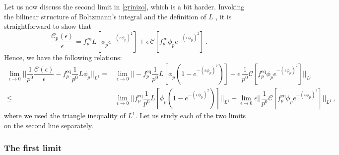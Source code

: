 \documentclass[a4paper, amsfonts, amssymb, amsmath, reprint, showkeys, nofootinbib, twoside, onecolumn,notitlepage,,longbibliography]{revtex4-2}
\theoremstyle{definition}
\theoremstyle{theorem}
\theoremstyle{corollary}
\begin{document}
Let us now discuss the second limit in \eqref{grinizo}, which is a bit harder. Invoking the bilinear structure of Boltzmann's integral and the definition of $L$ \cite[\S 9.3.1]{cercignani_book}, it is straightforward to show that
\begin{equation}
\dfrac{\mathcal{C}_p(\epsilon)}{\epsilon} = f_p^\text{eq}L [\phi_p e^{-(\epsilon\phi_p)^2}]+\epsilon \, \mathcal{C}[f_p^{\text{eq}}\phi_p e^{-(\epsilon\phi_p)^2}] \, .
\end{equation}
Hence, we have the following relations:
\begin{equation}\label{qqurello}
\begin{split}
\lim_{\epsilon \rightarrow 0} \bigg|\bigg| \dfrac{1}{p^0} \dfrac{\mathcal{C}(\epsilon)}{\epsilon} - f^{\text{eq}}_p \dfrac{1}{p^0} L\phi_p \bigg| \bigg|_{L^1}  ={}& \lim_{\epsilon \rightarrow 0} \bigg|\bigg| -f_p^\text{eq} \dfrac{1}{p^0}L [\phi_p(1- e^{-(\epsilon\phi_p)^2})]+\epsilon \,  \dfrac{1}{p^0}\mathcal{C}[f_p^{\text{eq}}\phi_p e^{-(\epsilon\phi_p)^2}] \bigg| \bigg|_{L^1} \\
\leq {}& \lim_{\epsilon \rightarrow 0} \bigg|\bigg| f_p^\text{eq} \dfrac{1}{p^0} L [\phi_p(1- e^{-(\epsilon\phi_p)^2})] \bigg| \bigg|_{L^1}+ \lim_{\epsilon \rightarrow 0} \epsilon \bigg| \bigg| \dfrac{1}{p^0} \mathcal{C}[f_p^{\text{eq}}\phi_p e^{-(\epsilon\phi_p)^2}] \bigg| \bigg|_{L^1} \, ,
\end{split}
\end{equation}
where we used the triangle inequality of $L^1$. Let us study each of the two limits on the second line separately.

\subsubsection{The first limit}
\end{document}
